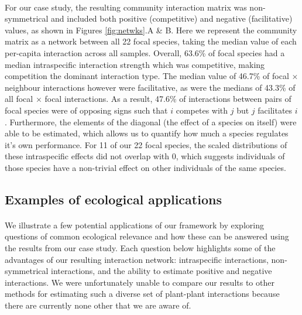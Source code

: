 \documentclass[a4,12pt]{article}
\begin{document}
    \paragraph{}
    For our case study, the resulting community interaction matrix was non-symmetrical and included both positive (competitive) and negative (facilitative) values, as shown in Figures \ref{fig:netwks}.A \& B. Here we represent the community matrix as a network between all 22 focal species, taking the median value of each per-capita interaction  across all samples. Overall, 63.6\% of focal species had a median intraspecific interaction strength which was competitive, making competition the dominant interaction type. The median value of 46.7\% of focal $\times$ neighbour interactions however were facilitative, as were the medians of 43.3\% of all focal $\times$ focal interactions. As a result, 47.6\% of interactions between pairs of focal species were of opposing signs such that $i$ competes with $j$ but $j$ facilitates $i$. Furthermore, the elements of the diagonal (the effect of a species on itself) were able to be estimated, which allows us to quantify how much a species regulates it's own performance. For 11 of our 22 focal species, the scaled distributions of these intraspecific effects did not overlap with 0, which suggests individuals of those species have a non-trivial effect on other individuals of the same species.




    \subsection{Examples of ecological applications}

    \paragraph{}
    We illustrate a few potential applications of our framework by exploring questions of common ecological relevance and how these can be answered using the results from our case study. Each question below highlights some of the advantages of our resulting interaction network: intraspecific interactions, non-symmetrical interactions, and the ability to estimate positive and negative interactions. We were unfortunately unable to compare our results to other methods for estimating such a diverse set of plant-plant interactions because there are currently none other that we are aware of.
\end{document}
